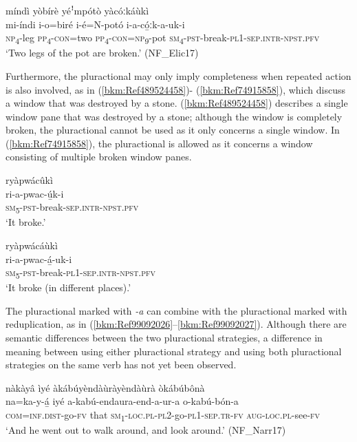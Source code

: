 \ea
\label{bkm:Ref74915410}
míndì yòbírè yéꜝmpótò yàcóːkáùkì\\
\gll mi-índi  i-o=biré    i-é=N-potó i-a-có̲ːk-a-uk-i\\
\textsc{np}\textsubscript{4}-leg  \textsc{pp}\textsubscript{4}-\textsc{con}=two  \textsc{pp}\textsubscript{4}-\textsc{con}=\textsc{np}\textsubscript{9}-pot
\textsc{sm}\textsubscript{4}-\textsc{pst}-break-\textsc{pl}1-\textsc{sep}.\textsc{intr}-\textsc{npst}.\textsc{pfv}\\
\glt ‘Two legs of the pot are broken.’ (NF\_Elic17)
\z

Furthermore, the pluractional may only imply completeness when repeated action is also involved, as in (\ref{bkm:Ref489524458})- (\ref{bkm:Ref74915858}), which discuss a window that was destroyed by a stone. (\ref{bkm:Ref489524458}) describes a single window pane that was destroyed by a stone; although the window is completely broken, the pluractional cannot be used as it only concerns a single window. In (\ref{bkm:Ref74915858}), the pluractional is allowed as it concerns a window consisting of multiple broken window panes.

\ea
\label{bkm:Ref489524458}
\glll ryàpwácûkì\\
ri-a-pwac-ú̲k-i\\
\textsc{sm}\textsubscript{5}-\textsc{pst}-break-\textsc{sep}.\textsc{intr}-\textsc{npst}.\textsc{pfv}\\
\glt ‘It broke.’
\z

\ea
\label{bkm:Ref74915858}
\glll ryàpwácáùkì\\
ri-a-pwac-á̲-uk-i\\
\textsc{sm}\textsubscript{5}-\textsc{pst}-break-\textsc{pl}1-\textsc{sep}.\textsc{intr}-\textsc{npst}.\textsc{pfv}\\
\glt ‘It broke (in different places).’
\z

The pluractional marked with \textit{-a} can combine with the pluractional marked with reduplication, as in (\ref{bkm:Ref99092026}--\ref{bkm:Ref99092027}). Although there are semantic differences between the two pluractional strategies, a difference in meaning between using either pluractional strategy and using both pluractional strategies on the same verb has not yet been observed.

\ea
\label{bkm:Ref99092026}
nàkàyâ ìyé àkábúyèndàùràyèndàùrà òkábúbônà\\
\gll na=ka-y-á̲ iyé  a-kabú-endaura-end-a-ur-a    o-kabú-bón-a \\
\textsc{com}=\textsc{inf}.\textsc{dist}-go-\textsc{fv}
that  \textsc{sm}\textsubscript{1}-\textsc{loc}.\textsc{pl}-\textsc{pl}2-go-\textsc{pl}1-\textsc{sep}.\textsc{tr}-\textsc{fv}  \textsc{aug}-\textsc{loc}.\textsc{pl}-see-\textsc{fv}\\
\glt ‘And he went out to walk around, and look around.’ (NF\_Narr17)
\z

